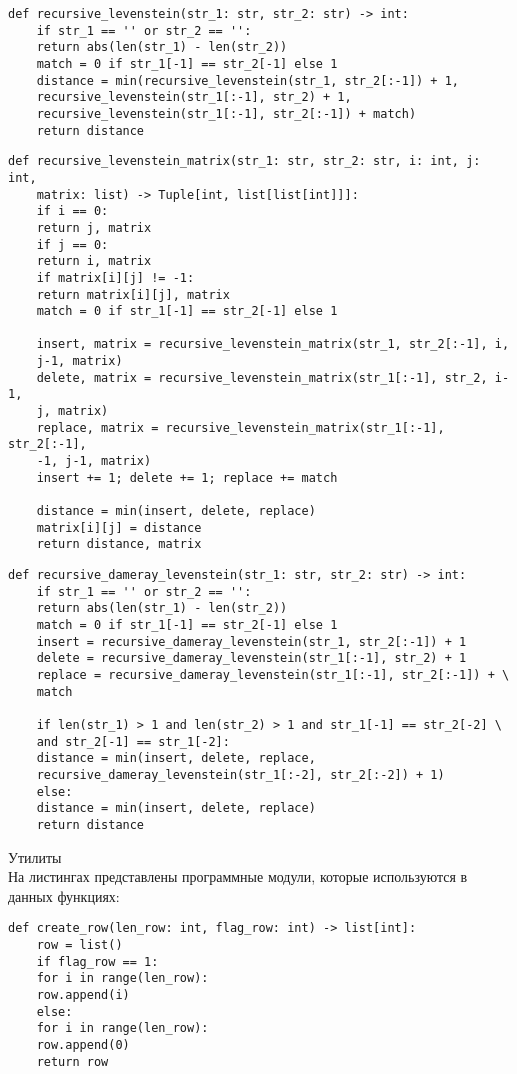 \begin{lstlisting}[label=some-code,caption=Программный код нахождения расстояния Левенштейна рекурсивно без использования кэша]
	def recursive_levenstein(str_1: str, str_2: str) -> int:
	if str_1 == '' or str_2 == '':
	return abs(len(str_1) - len(str_2))
	match = 0 if str_1[-1] == str_2[-1] else 1
	distance = min(recursive_levenstein(str_1, str_2[:-1]) + 1,
	recursive_levenstein(str_1[:-1], str_2) + 1,
	recursive_levenstein(str_1[:-1], str_2[:-1]) + match)
	return distance
\end{lstlisting}

\begin{lstlisting}[label=some-code,caption=Программный код нахождения расстояния Левенштейна рекурсивно с использованием матрицы]
	def recursive_levenstein_matrix(str_1: str, str_2: str, i: int, j: int,
	matrix: list) -> Tuple[int, list[list[int]]]:
	if i == 0:
	return j, matrix
	if j == 0:
	return i, matrix
	if matrix[i][j] != -1:
	return matrix[i][j], matrix
	match = 0 if str_1[-1] == str_2[-1] else 1
	
	insert, matrix = recursive_levenstein_matrix(str_1, str_2[:-1], i,
	j-1, matrix)
	delete, matrix = recursive_levenstein_matrix(str_1[:-1], str_2, i-1,
	j, matrix)
	replace, matrix = recursive_levenstein_matrix(str_1[:-1], str_2[:-1],
	-1, j-1, matrix)
	insert += 1; delete += 1; replace += match
	
	distance = min(insert, delete, replace)
	matrix[i][j] = distance
	return distance, matrix
\end{lstlisting}

\begin{lstlisting}[label=some-code,caption=Программный код нахождения расстояния Дамерау-Левенштейна рекурсивно]
	def recursive_dameray_levenstein(str_1: str, str_2: str) -> int:
	if str_1 == '' or str_2 == '':
	return abs(len(str_1) - len(str_2))
	match = 0 if str_1[-1] == str_2[-1] else 1
	insert = recursive_dameray_levenstein(str_1, str_2[:-1]) + 1
	delete = recursive_dameray_levenstein(str_1[:-1], str_2) + 1
	replace = recursive_dameray_levenstein(str_1[:-1], str_2[:-1]) + \
	match
	
	if len(str_1) > 1 and len(str_2) > 1 and str_1[-1] == str_2[-2] \
	and str_2[-1] == str_1[-2]:
	distance = min(insert, delete, replace,
	recursive_dameray_levenstein(str_1[:-2], str_2[:-2]) + 1)
	else:
	distance = min(insert, delete, replace)
	return distance
\end{lstlisting}

\Large Утилиты \\
\normalsize На листингах представлены программные модули, которые используются в данных функциях:\\
\begin{lstlisting}[label=some-code,caption=Программный код создания для кэша в виде строки]
	def create_row(len_row: int, flag_row: int) -> list[int]:
	row = list()
	if flag_row == 1:
	for i in range(len_row):
	row.append(i)
	else:
	for i in range(len_row):
	row.append(0)
	return row
\end{lstlisting}

